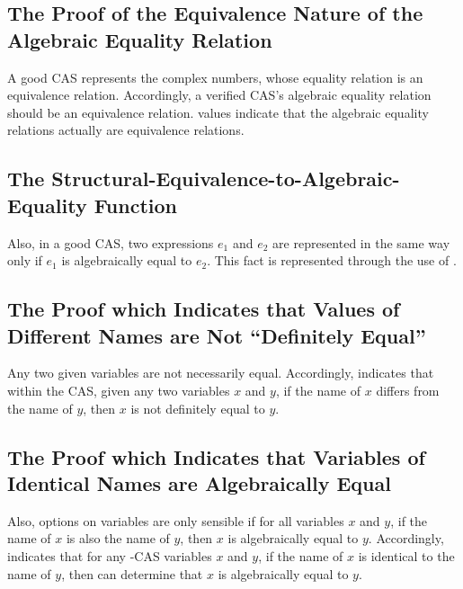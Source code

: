 \documentclass{report}
\begin{document}
\subsection{The Proof of the Equivalence Nature of the Algebraic Equality Relation}
A good CAS represents the complex numbers, whose equality relation is an equivalence relation.  Accordingly, a verified CAS's algebraic equality relation should be an equivalence relation.   values indicate that the algebraic equality relations actually are equivalence relations.

\subsection{The Structural-Equivalence-to-Algebraic-Equality Function}
Also, in a good CAS, two expressions \(e_1\) and \(e_2\) are represented in the same way only if \(e_1\) is algebraically equal to \(e_2\).  This fact is represented through the use of .

\subsection{The Proof which Indicates that Values of Different Names are Not ``Definitely Equal''}
Any two given variables are not necessarily equal.  Accordingly,   indicates that within the  CAS, given any two  variables \(x\) and \(y\), if the name of \(x\) differs from the name of \(y\), then \(x\) is not definitely equal to \(y\).

\subsection{The Proof which Indicates that Variables of Identical Names are Algebraically Equal}
Also, options on variables are only sensible if for all variables \(x\) and \(y\), if the name of \(x\) is also the name of \(y\), then \(x\) is algebraically equal to \(y\).  Accordingly,   indicates that for any -CAS variables \(x\) and \(y\), if the name of \(x\) is identical to the name of \(y\), then  can determine that \(x\) is algebraically equal to \(y\).
\end{document}
